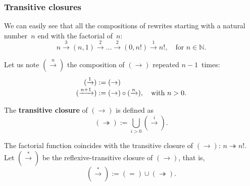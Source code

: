 \documentclass[compress,dvipdfmx]{beamer}
\begin{document}
\begin{frame}
  \frametitle{Transitive closures}

  We can easily see that all the compositions of rewrites starting
  with a natural number~\(n\) end with the factorial of~\(n\):
  \smallskip
  \begin{equation*}
    n \xrightarrow{3} (n,1)
    \xrightarrow{2} \dots
    \xrightarrow{2} (0,n!)
    \xrightarrow{1}
    n!, \quad \text{for \(n \in \mathbb{N}\)}.
  \end{equation*}

  Let us note \((\xrightarrow{n})\) the composition of
  \((\rightarrow)\) repeated \(n-1\)~times:
  \begin{align*}
    (\xrightarrow{1})   &:= (\rightarrow)\\
    (\xrightarrow{\smash{n+1}}) & :=
    (\rightarrow) \circ (\xrightarrow{\smash{n}}),
    \quad\text{with \(n > 0\)}.
  \end{align*}

  The \textbf{transitive closure} of \((\rightarrow)\) is defined as
  \begin{equation*}
    (\twoheadrightarrow) := \bigcup_{i > 0}{(\xrightarrow{i})}.
  \end{equation*}

  The factorial function coincides with the transitive closure of
  \((\rightarrow)\): \(n \twoheadrightarrow n!\). Let
  \((\xrightarrow{*})\) be the reflexive\hyp{}transitive closure of
  \((\rightarrow)\), that is,
  \begin{equation*}
    (\xrightarrow{*}) := (=) \cup (\twoheadrightarrow).
  \end{equation*}

\end{frame}
\end{document}
